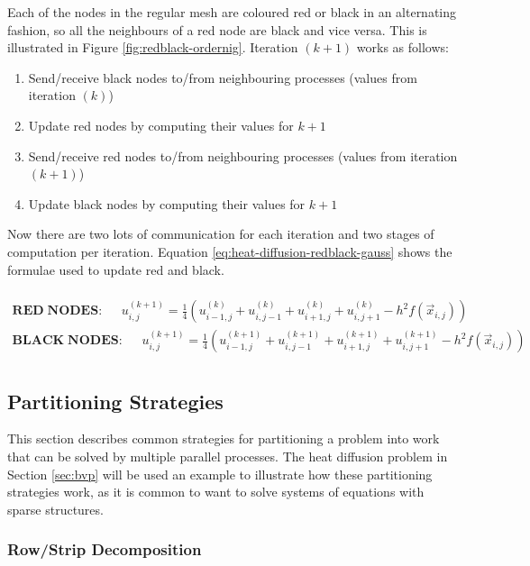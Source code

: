 \documentclass{article}
\begin{document}
Each of the nodes in the regular mesh are coloured red or black in an alternating fashion, so all the neighbours of a red node are black and vice versa. This is illustrated in Figure \ref{fig:redblack-ordernig}. Iteration $(k + 1)$ works as follows:
\begin{enumerate}
	\item Send/receive black nodes to/from neighbouring processes (values from iteration $(k)$)
	\item Update red nodes by computing their values for $k + 1$
	\item Send/receive red nodes to/from neighbouring processes (values from iteration $(k + 1)$)
	\item Update black nodes by computing their values for $k + 1$
\end{enumerate}
Now there are two lots of communication for each iteration and two stages of computation per iteration. Equation \ref{eq:heat-diffusion-redblack-gauss} shows the formulae used to update red and black.

\begin{multline}\\
	\mathbf{RED\;NODES}: \;\;\;\;\;
	u_{i,j}^{(k + 1)} = \frac{1}{4}\left( u_{i-1,j}^{(k)} + u_{i,j-1}^{(k)} + u_{i+1,j}^{(k)} + u_{i,j+1}^{(k)} - h^2f(\vec{x}_{i,j}) \right) \\
	\mathbf{BLACK\;NODES}: \;\;\;\;\;
	u_{i,j}^{(k + 1)} = \frac{1}{4}\left( u_{i-1,j}^{(k+1)} + u_{i,j-1}^{(k+1)} + u_{i+1,j}^{(k+1)} + u_{i,j+1}^{(k+1)} - h^2f(\vec{x}_{i,j}) \right) \\
	\label{eq:heat-diffusion-redblack-gauss}
\end{multline}

\subsection{Partitioning Strategies}

This section describes common strategies for partitioning a problem into work that can be solved by multiple parallel processes. The heat diffusion problem in Section \ref{sec:bvp} will be used an example to illustrate how these partitioning strategies work, as it is common to want to solve systems of equations with sparse structures.

\subsubsection{Row/Strip Decomposition}
\end{document}
